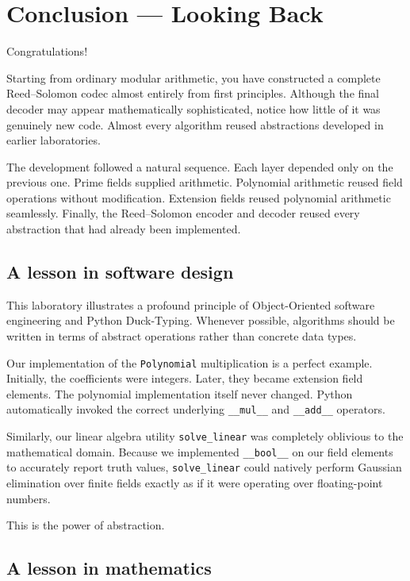 \section*{Conclusion --- Looking Back}

Congratulations!

Starting from ordinary modular arithmetic, you have constructed a complete Reed--Solomon codec almost entirely from first principles. Although the final decoder may appear mathematically sophisticated, notice how little of it was genuinely new code. Almost every algorithm reused abstractions developed in earlier laboratories.

The development followed a natural sequence. Each layer depended only on the previous one. Prime fields supplied arithmetic. Polynomial arithmetic reused field operations without modification. Extension fields reused polynomial arithmetic seamlessly. Finally, the Reed--Solomon encoder and decoder reused every abstraction that had already been implemented.

\subsection*{A lesson in software design}

This laboratory illustrates a profound principle of Object-Oriented software engineering and Python Duck-Typing. Whenever possible, algorithms should be written in terms of abstract operations rather than concrete data types.

Our implementation of the \lstinline|Polynomial| multiplication is a perfect example. Initially, the coefficients were integers. Later, they became extension field elements. The polynomial implementation itself never changed. Python automatically invoked the correct underlying \lstinline|__mul__| and \lstinline|__add__| operators. 

Similarly, our linear algebra utility \lstinline|solve_linear| was completely oblivious to the mathematical domain. Because we implemented \lstinline|__bool__| on our field elements to accurately report truth values, \lstinline|solve_linear| could natively perform Gaussian elimination over finite fields exactly as if it were operating over floating-point numbers.

This is the power of abstraction.

\subsection*{A lesson in mathematics}


